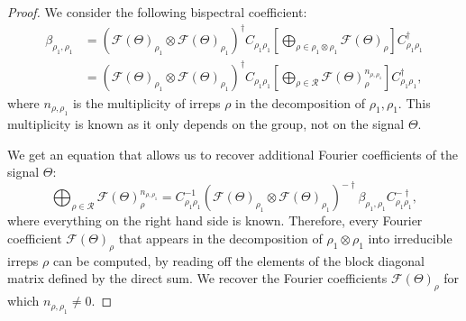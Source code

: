 \begin{proof}
    We consider the following bispectral coefficient:
    \begin{align*}
    \beta_{\rho_1, \rho_1}
    &=
    (\mathcal{F}(\Theta)_{\rho_1} \otimes \mathcal{F}(\Theta)_{\rho_1})^\dagger C_{{\rho_1} {\rho_1}}
    \left[
    \bigoplus_{\rho \in \rho_1 \otimes \rho_1}
        \mathcal{F}(\Theta)_\rho
    \right] C_{{\rho_1} {\rho_1}}^{\dagger}\\
    &=
        (\mathcal{F}(\Theta)_{\rho_1} \otimes \mathcal{F}(\Theta)_{\rho_1})^\dagger
        C_{{\rho_1} {\rho_1}}
    \left[
    \bigoplus_{\rho \in \mathcal{R}}
        \mathcal{F}(\Theta)_\rho^{n_{\rho, \rho_1}}
    \right] C_{{\rho_1} {\rho_1}}^{\dagger},
    \end{align*}
    where $n_{\rho, \rho_1}$ is the multiplicity of irreps $\rho$ in the decomposition of $\rho_1, \rho_1$. This multiplicity is known as it only depends on the group, not on the signal $\Theta$.

    We get an equation that allows us to recover additional Fourier coefficients of the signal $\Theta$:
    \begin{equation}
        \bigoplus_{\rho \in \mathcal{R}}
        \mathcal{F}(\Theta)_\rho^{n_{\rho, \rho_1}}
    = C_{{\rho_1} {\rho_1}}^{-1}(\mathcal{F}(\Theta)_{\rho_1} \otimes \mathcal{F}(\Theta)_{\rho_1})^{-\dagger} \beta_{\rho_1, \rho_1} C_{{\rho_1} {\rho_1}}^{-\dagger},
    \end{equation}
    where everything on the right hand side is known.
    Therefore, every Fourier coefficient $\mathcal{F}(\Theta)_\rho$ that appears in the decomposition of $\rho_1 \otimes \rho_1$ into irreducible irreps $\rho$ can be computed, by reading off the elements of the block diagonal matrix defined by the direct sum. We recover the Fourier coefficients $\mathcal{F}(\Theta)_\rho$ for which $n_{\rho, \rho_1} \neq 0$.


\end{proof}
